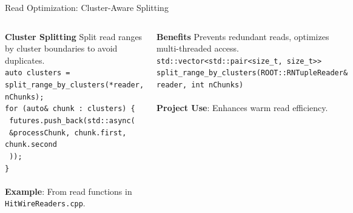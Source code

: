 \documentclass[aspectratio=169]{beamer}
\begin{document}
\begin{frame}{Read Optimization: Cluster-Aware Splitting}
  \begin{columns}
    \textbf{Cluster Splitting}
    \small Split read ranges by cluster boundaries to avoid duplicates.
    \vspace{0.5em}\\
    \texttt{auto clusters = split\_range\_by\_clusters(*reader, nChunks);} \\
    \texttt{for (auto\& chunk : clusters) \{} \\
    \texttt{    futures.push\_back(std::async(} \\
    \texttt{        \&processChunk, chunk.first, chunk.second} \\
    \texttt{    ));} \\
    \texttt{\}} \\
    \vspace{0.5em}\\
    \textbf{Example}: From read functions in \texttt{HitWireReaders.cpp}.

    \textbf{Benefits}
    \small Prevents redundant reads, optimizes multi-threaded access.
    \vspace{0.5em}\\
    \texttt{std::vector<std::pair<size\_t, size\_t>>} \\
    \texttt{split\_range\_by\_clusters(ROOT::RNTupleReader\& reader, int nChunks)} \\
    \vspace{0.5em}\\
    \textbf{Project Use}: Enhances warm read efficiency.
  \end{columns}
\end{frame}
\end{document}
